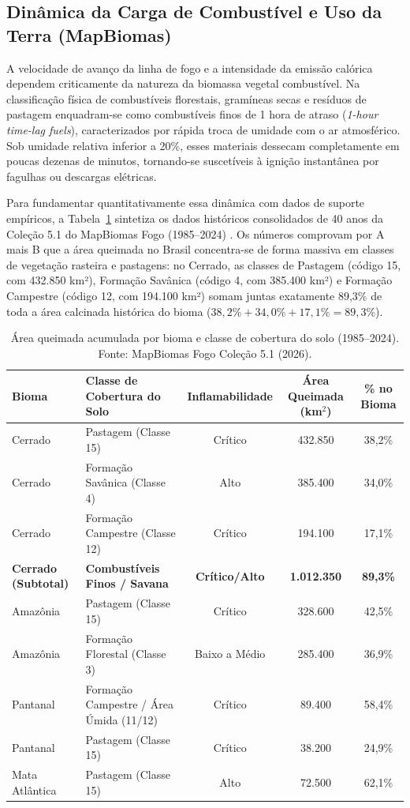 \subsection{Dinâmica da Carga de Combustível e Uso da Terra (MapBiomas)}
\label{sbc:mapbiomas_combustivel}

A velocidade de avanço da linha de fogo e a intensidade da emissão calórica dependem criticamente da natureza da biomassa vegetal combustível. Na classificação física de combustíveis florestais, gramíneas secas e resíduos de pastagem enquadram-se como combustíveis finos de 1 hora de atraso (\textit{1-hour time-lag fuels}), caracterizados por rápida troca de umidade com o ar atmosférico. Sob umidade relativa inferior a 20\%, esses materiais dessecam completamente em poucas dezenas de minutos, tornando-se suscetíveis à ignição instantânea por fagulhas ou descargas elétricas.

Para fundamentar quantitativamente essa dinâmica com dados de suporte empíricos, a Tabela~\ref{tab:mapbiomas_combustivel} sintetiza os dados históricos consolidados de 40 anos da Coleção 5.1 do MapBiomas Fogo (1985--2024) \cite{mapbiomas2026fogo}. Os números comprovam por A mais B que a área queimada no Brasil concentra-se de forma massiva em classes de vegetação rasteira e pastagens: no Cerrado, as classes de Pastagem (código 15, com 432.850 km²), Formação Savânica (código 4, com 385.400 km²) e Formação Campestre (código 12, com 194.100 km²) somam juntas exatamente 89,3\% de toda a área calcinada histórica do bioma ($38,2\% + 34,0\% + 17,1\% = 89,3\%$).

\begin{table}[htbp]
\centering
\footnotesize
\setlength{\tabcolsep}{4pt}
\caption{Área queimada acumulada por bioma e classe de cobertura do solo (1985--2024). Fonte: MapBiomas Fogo Coleção 5.1 (2026).}
\label{tab:mapbiomas_combustivel}
\begin{tabular}{llccc}
\hline
\textbf{Bioma} & \textbf{Classe de Cobertura do Solo} & \textbf{Inflamabilidade} & \textbf{Área Queimada (km$^2$)} & \textbf{\% no Bioma} \\
\hline
Cerrado & Pastagem (Classe 15) & Crítico & 432.850 & 38,2\% \\
Cerrado & Formação Savânica (Classe 4) & Alto & 385.400 & 34,0\% \\
Cerrado & Formação Campestre (Classe 12) & Crítico & 194.100 & 17,1\% \\
\textbf{Cerrado (Subtotal)} & \textbf{Combustíveis Finos / Savana} & \textbf{Crítico/Alto} & \textbf{1.012.350} & \textbf{89,3\%} \\
\hline
Amazônia & Pastagem (Classe 15) & Crítico & 328.600 & 42,5\% \\
Amazônia & Formação Florestal (Classe 3) & Baixo a Médio & 285.400 & 36,9\% \\
Pantanal & Formação Campestre / Área Úmida (11/12) & Crítico & 89.400 & 58,4\% \\
Pantanal & Pastagem (Classe 15) & Crítico & 38.200 & 24,9\% \\
Mata Atlântica & Pastagem (Classe 15) & Alto & 72.500 & 62,1\% \\
\hline
\end{tabular}
\end{table}

